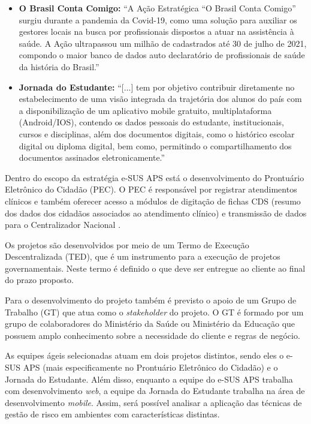 \documentclass[
    12pt,       %
    openright,      %
    twoside,      %
    a4paper,      %
    english,      %
    french,       %
    spanish,      %
    brazil,       %
    ]{abntex2}
\begin{document}
\begin{itemize}
    \item \textbf{O Brasil Conta Comigo:} ``A Ação Estratégica “O Brasil Conta Comigo” surgiu durante a pandemia da Covid-19, como uma solução para auxiliar os gestores locais na busca por profissionais dispostos a atuar na assistência à saúde. A Ação ultrapassou um milhão de cadastrados até 30 de julho de 2021, compondo o maior banco de dados auto declaratório de profissionais de saúde da história do Brasil.''
    
    \item \textbf{Jornada do Estudante:} ``[...] tem por objetivo contribuir diretamente no estabelecimento de uma visão integrada da trajetória dos alunos do país com a disponibilização de um aplicativo mobile gratuito, multiplataforma (Android/IOS), contendo os dados pessoais do estudante, institucionais, cursos e disciplinas, além dos documentos digitais, como o histórico escolar digital ou diploma digital, bem como, permitindo o compartilhamento dos documentos assinados eletronicamente.'' \cite{MEC:2021}
\end{itemize}

Dentro do escopo da estratégia e-SUS APS está o desenvolvimento do Prontuário Eletrônico do Cidadão (PEC). O PEC é responsável por registrar atendimentos clínicos e também oferecer acesso a módulos de digitação de fichas CDS (resumo dos dados dos cidadãos associados ao atendimento clínico) e transmissão de dados para o Centralizador Nacional \cite{Bridge:2022}.

Os projetos são desenvolvidos por meio de um Termo de Execução Descentralizada (TED), que é um instrumento para a execução de projetos governamentais. Neste termo é definido o que deve ser entregue ao cliente ao final do prazo proposto. 

Para o desenvolvimento do projeto também é previsto o apoio de um Grupo de Trabalho (GT) que atua como o \textit{stakeholder} do projeto. O GT é formado por um grupo de colaboradores do Ministério da Saúde ou Ministério da Educação que possuem amplo conhecimento sobre a necessidade do cliente e regras de negócio.

As equipes ágeis selecionadas atuam em dois projetos distintos, sendo eles o e-SUS APS (mais especificamente no Prontuário Eletrônico do Cidadão) e o Jornada do Estudante. Além disso, enquanto a equipe do e-SUS APS trabalha com desenvolvimento \textit{web}, a equipe da Jornada do Estudante trabalha na área de desenvolvimento \textit{mobile}. Assim, será possível analisar a aplicação das técnicas de gestão de risco em ambientes com características distintas.
\end{document}
